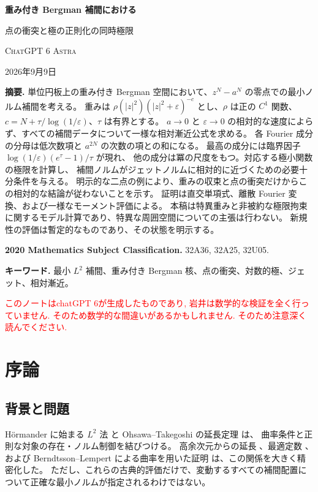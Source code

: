 \documentclass[12pt]{amsart}
\theoremstyle{definition}
\theoremstyle{remark}
\numberwithin{equation}{section}
\newcommand{\xr}[1]{\textcolor{red}{#1}}
\theoremstyle{definition}
\begin{document}
\newpage
\setcounter{section}{0}
\setcounter{equation}{0}
\setcounter{thm}{0}
\renewcommand{\theHsection}{ja.\arabic{section}}
\renewcommand{\theHequation}{ja.\thesection.\arabic{equation}}
\renewcommand{\theHthm}{ja.\thesection.\arabic{thm}}
\linespread{1.08}\selectfont
\begin{center}
{\Large\bfseries 重み付き Bergman 補間における\par
点の衝突と極の正則化の同時極限}\par\medskip
{\scshape ChatGPT 6 Astra}\par\smallskip
2026年9月9日
\end{center}
\medskip
\noindent\textbf{摘要.}
単位円板上の重み付き Bergman 空間において、$z^N-a^N$ の零点での最小ノルム補間を考える。
重みは $\rho(|z|^2)(|z|^2+\varepsilon)^{-c}$ とし、$\rho$ は正の $C^1$ 関数、
$c=N+\tau/\log(1/\varepsilon)$、$\tau$ は有界とする。
$a\to0$ と $\varepsilon\to0$ の相対的な速度によらず、すべての補間データについて一様な相対漸近公式を求める。
各 Fourier 成分の分母は低次数項と $a^{2N}$ の次数の項との和になる。
最高の成分には臨界因子 $\log(1/\varepsilon)(e^\tau-1)/\tau$ が現れ、
他の成分は冪の尺度をもつ。対応する極小関数の極限を計算し、
補間ノルムがジェットノルムに相対的に近づくための必要十分条件を与える。
明示的な二点の例により、重みの収束と点の衝突だけからこの相対的な結論が従わないことを示す。
証明は直交単項式、離散 Fourier 変換、および一様なモーメント評価による。
本稿は特異重みと非被約な極限拘束に関するモデル計算であり、特異な周囲空間についての主張は行わない。
新規性の評価は暫定的なものであり、その状態を明示する。
\par\medskip
\noindent\textbf{2020 Mathematics Subject Classification.} 32A36, 32A25, 32U05.\par
\noindent\textbf{キーワード.} 最小 $L^2$ 補間、重み付き Bergman 核、点の衝突、対数的極、ジェット、相対漸近。


\xr{このノートはchatGPT 6が生成したものであり, 岩井は数学的な検証を全く行っていません. そのため数学的な間違いがあるかもしれません. そのため注意深く読んでください.}


\section{序論}
\subsection{背景と問題}
H\"ormander に始まる $L^2$ 法 \cite{H65} と Ohsawa--Takegoshi の延長定理 \cite{OT87} は、
曲率条件と正則な対象の存在・ノルム制御を結びつける。
高余次元からの延長 \cite{M93}、最適定数 \cite{B13,GZ15}、
および Berndtsson--Lempert による曲率を用いた証明 \cite{BL16} は、この関係を大きく精密化した。
ただし、これらの古典的評価だけで、変動するすべての補間配置について正確な最小ノルムが指定されるわけではない。
\end{document}
